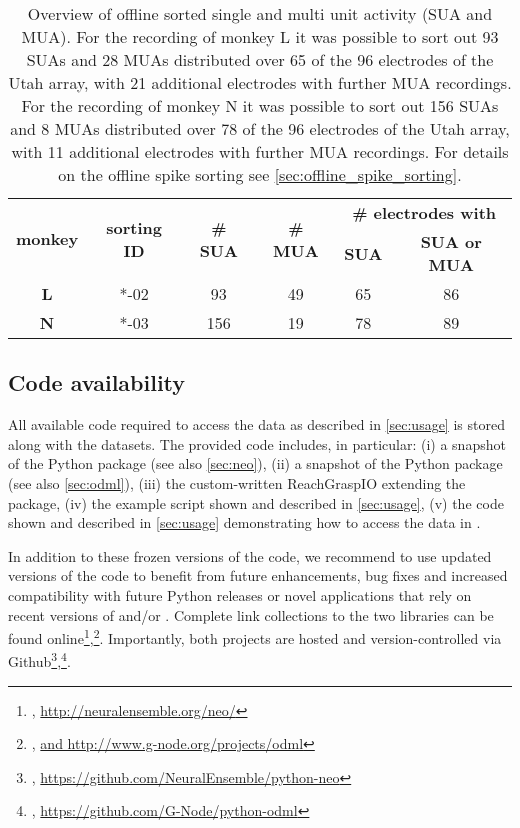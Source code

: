 \begin{table}
\centering
\begin{tabular}{cccccc}
\hline 
\multirow{2}{*}{\textbf{monkey}} & \multirow{2}{*}{\textbf{sorting ID}} & \multirow{2}{*}{\textbf{\# SUA}} & \multirow{2}{*}{\textbf{\# MUA}} & \multicolumn{2}{c}{\textbf{\# electrodes with}}\tabularnewline
 &  &  &  & \textbf{SUA} & \textbf{SUA or MUA}\tabularnewline
\hline 
\hline 
\textbf{L} & {*}-02 & 93 & 49 & 65 & 86\tabularnewline
\textbf{N} & {*}-03 & 156 & 19 & 78 & 89\tabularnewline
\hline 
\end{tabular}

\caption[Overview of offline sorted single and multi unit activity (SUA and MUA)]{Overview of offline sorted single and multi unit activity (SUA and MUA). For the recording of monkey L it was possible to sort out 93 SUAs and 28 MUAs distributed over 65 of the 96 electrodes of the Utah array, with 21 additional electrodes with further MUA recordings. For the recording of monkey N it was possible to sort out 156 SUAs and 8 MUAs distributed over 78 of the
96 electrodes of the Utah array, with 11 additional electrodes with further MUA recordings. For details on the offline spike sorting see \cref{sec:offline_spike_sorting}.}
\label{tab:datafiles_unitactivity}
\end{table}

\subsection{Code availability}
\label{sec:code_availability}

All available code required to access the data as described in \cref{sec:usage} is stored along with the datasets. The provided code includes, in particular: (i) a snapshot of the Python   package (see also \cref{sec:neo}), (ii) a snapshot of the Python  package (see also \cref{sec:odml}), (iii) the custom-written ReachGraspIO extending the  package, (iv) the example script shown and described in \cref{sec:usage}, (v) the code shown and described in \cref{sec:usage} demonstrating how to access the data in .

In addition to these frozen versions of the code, we recommend to use updated versions of the code to benefit from future enhancements, bug fixes and increased compatibility with future Python releases or novel applications that rely on recent versions of  and/or . Complete link collections to the two libraries can be found online\footnote{, \url{http://neuralensemble.org/neo/}},\footnote{, \url{ and http://www.g-node.org/projects/odml}}. Importantly, both projects are hosted and version-controlled via Github\footnote{, \url{https://github.com/NeuralEnsemble/python-neo}},\footnote{, \url{https://github.com/G-Node/python-odml}}.

